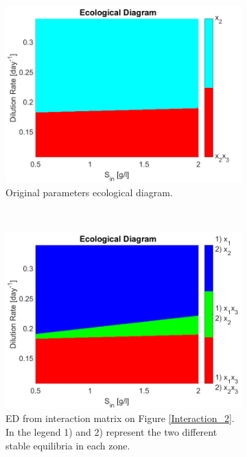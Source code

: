 \documentclass[3p,times]{article}
\begin{document}
\begin{figure}[h]
	\centering
	\begin{subfigure}[t]{0.32\textwidth}
	\includegraphics[width=\textwidth]{Stability/ED_parameters_Dumont}
	\caption{Original parameters ecological diagram.}
	\label{ED 1}
	\end{subfigure}
~
	\begin{subfigure}[t]{0.32\textwidth}
	\includegraphics[width=\textwidth]{Stability/ED_parameters_modified}
	\caption{ED from interaction matrix on Figure \ref{Interaction_2}. In the legend 1) and 2) represent the two different stable equilibria in each zone.}
	\label{ED 2}
	\end{subfigure}
~
\begin{subfigure}[t]{0.32\textwidth}

\end{subfigure}
\end{figure}
\end{document}
